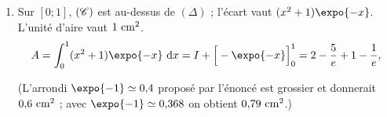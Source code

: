 \begin{description}
\begin{enumerate}
\begin{enumerate}
                  Donc $I = -\expo{-1} + 2 - 4\expo{-1}$,  ($\simeq 0{,}16$).
               \item {}
                  Sur $[0 ; 1]$, $(\mathscr{C})$ est au-dessus de $(\Delta)$ ; l'\'ecart vaut $(x^2 + 1)\expo{-x}$. L'unit\'e d'aire vaut $1~\mathrm{cm}^2$.
                  \[
                     A = \int_0^1 (x^2 + 1)\expo{-x}\dx = I + \Big[-\expo{-x}\Big]_0^1 = 2 - \frac{5}{e} + 1 - \frac{1}{e},
                  \]
                  \par\noindent{}
                  (L'arrondi $\expo{-1} \simeq 0{,}4$ propos\'e par l'\'enonc\'e est grossier et donnerait $0{,}6~\mathrm{cm}^2$ ; avec $\expo{-1} \simeq 0{,}368$ on obtient $0{,}79~\mathrm{cm}^2$.)
            \end{enumerate}
      \end{enumerate}
\end{description}
